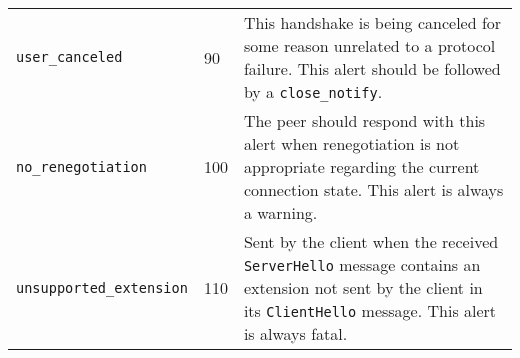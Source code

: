 \begin{tabularx}{\linewidth}{@{}l l X}
    \texttt{user\_canceled}               & 90  & This handshake is being canceled for some reason unrelated to a protocol failure. This alert should be followed
                                                  by a \texttt{close\_notify}. \\
    \texttt{no\_renegotiation}            & 100 & The peer should respond with this alert when renegotiation is not appropriate regarding the current connection
                                                  state. This alert is always a warning. \\
    \texttt{unsupported\_extension}       & 110 & Sent by the client when the received \texttt{ServerHello} message contains an extension not sent by the client
                                                  in its \texttt{ClientHello} message. This alert is always fatal.
    \end{tabularx}
